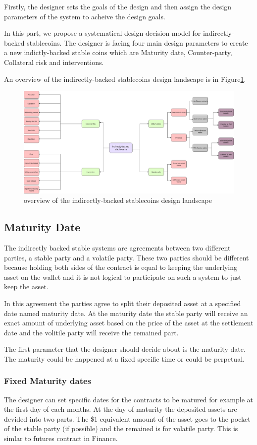 \documentclass[runningheads]{llncs}
\begin{document}
Firstly, the designer sets the goals of the design and then assign the design parameters of the system to acheive the design goals.

In this part, we propose a systematical design-decision model for indirectly-backed stablecoins. The designer is facing four main design parameters to create a new indictly-backed stable coins which are Maturity date, Counter-party, Collateral risk and interventions. 



An overview of the indirectly-backed stablecoins design landscape is in Figure\ref{land}.

\begin{figure} 
\centering
\includegraphics[width=12cm]{Mindmap}
\caption{overview of the indirectly-backed stablecoins design landscape}
\label{land}
\end{figure}

\subsection{Maturity Date}
The indirectly backed stable systems are agreements between two different parties, a stable party and a volatile party. These two parties should be different because holding both sides of the contract is equal to keeping the underlying asset on the wallet and it is not logical to participate on such a system to just keep the asset.

In this agreement the parties agree to split their deposited asset at a specified date named maturity date. At the maturity date the stable party will receive an exact amount of underlying asset based on the price of the asset at the settlement date and the volitile party will receive the remained part.

The first parameter that the designer should decide about is the maturity date. The maturity could be happened at a fixed specific time or could be perpetual.
\subsubsection{Fixed Maturity dates}
The designer can set specific dates for the contracts to be matured for example at the first day of each months. At the day of maturity the deposited assets are devided into two parts. The \$1 equivalent amount of the asset goes to the pocket of the stable party (if possible) and the remained is for volatile party. This is simlar to futures contract in Finance.
\end{document}

